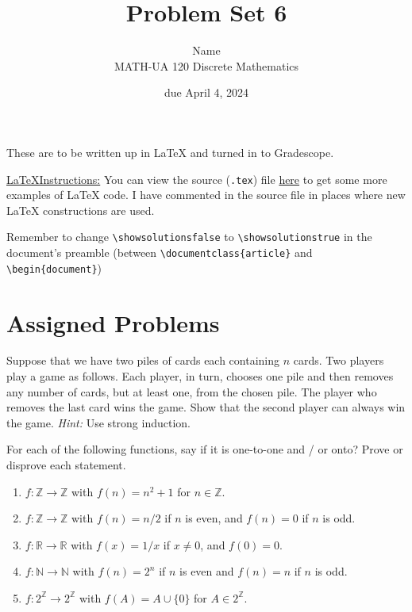 \documentclass{article}
\title{Problem Set 6}
\author{%
    Name
\\  MATH-UA 120 Discrete Mathematics
}
\date{due April 4, 2024}
\newif\ifshowsolutions
\newcommand{\danger}{\marginpar[\hfill\dbend]{\dbend\hfill}}
\newcommand{\Z}{\mathbb{Z}}
\newcommand{\N}{\mathbb{N}}
\newcommand{\R}{\mathbb{R}}
\theoremstyle{definition}
\begin{document}
\maketitle



These are to be written up in \LaTeX{} and turned in to Gradescope.



\ifshowsolutions
    \SetupExSheets{solution/print=true}
\else
    \danger
 \underline{ \LaTeX  Instructions:}  You can view the source (\texttt{.tex}) file \href{https://bit.ly/4cCEb3d}{here} to get some more examples of \LaTeX{} code.  I have commented in the source file in places where new \LaTeX{} constructions are used.
  
  Remember to change \verb|\showsolutionsfalse| to \verb|\showsolutionstrue|
    in the document's preamble 
    (between \verb|\documentclass{article}| and \verb|\begin{document}|)
\fi

\section*{Assigned Problems}


\begin{question}{9}
    Suppose that we have two piles of cards each containing \(n\) cards. Two players play a game as follows. Each player, in turn, chooses one pile and then removes any number of cards, but at least one, from the chosen pile. The player who removes the last card wins the game. Show that the second player can always win the game. \textit{Hint:} Use strong induction.
\end{question}
\begin{solution}
\end{solution}


\begin{question}{10}
    For each of the following functions, say if it is one-to-one and / or onto? Prove or disprove each statement.
    \begin{enumerate}
	\item \(f \colon  \Z \to \Z\) with \(f(n) = n^2 + 1\) for \(n \in \Z\).
	\item \(f \colon  \Z \to \Z\) with \(f(n) = n/2\) if \(n\) is even, and \(f(n) = 0\) if \(n\) is odd.
	\item \(f \colon  \R \to \R\) with \(f(x) = 1/x\) if \(x \neq 0\), and \(f(0) = 0\).
	\item \(f\colon \N \to \N\) with \(f(n) = 2^n\) if \(n\) is even and \(f(n) = n\) if \(n\) is odd.
	\item \(f \colon  2^{\Z} \to 2^{\Z}\) with \(f(A) = A \cup \{ 0 \}\) for \(A \in 2^{\Z}\).
    \end{enumerate}
\end{question}
\begin{solution}
\end{solution}
\end{document}
